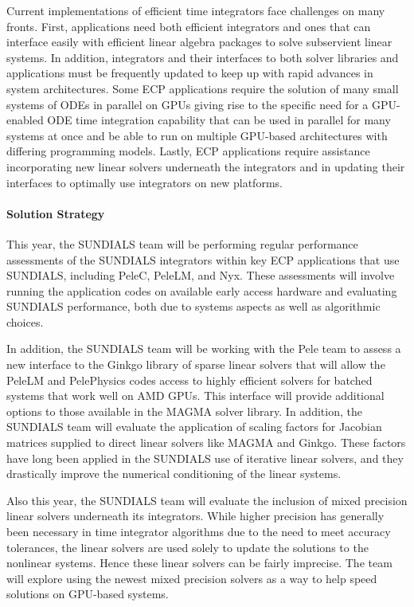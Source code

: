 Current implementations of efficient time integrators face challenges on many
fronts.  First, applications need both efficient integrators and ones that can
interface easily with efficient linear algebra packages to solve subservient
linear systems.  In addition, integrators and their interfaces to both solver
libraries and applications must be frequently updated to keep up with rapid
advances in system architectures. Some ECP applications require the solution of
many small systems of ODEs in parallel on GPUs giving rise to the specific need
for a GPU-enabled ODE time integration capability that can be used in parallel
for many systems at once and be able to run on multiple GPU-based architectures
with differing programming models.  Lastly, ECP applications require assistance
incorporating new linear solvers underneath the integrators and in updating
their interfaces to optimally use integrators on new platforms.


\paragraph{Solution Strategy}

This year, the SUNDIALS team will be performing regular performance assessments
of the SUNDIALS integrators within key ECP applications that use SUNDIALS,
including PeleC, PeleLM, and Nyx.  These assessments will involve running the
application codes on available early access hardware and evaluating SUNDIALS
performance, both due to systems aspects as well as algorithmic choices.

In addition, the SUNDIALS team will be working with the Pele team to assess a
new interface to the Ginkgo library of sparse linear solvers that will allow the
PeleLM and PelePhysics codes access to highly efficient solvers for batched
systems that work well on AMD GPUs.  This interface will provide additional
options to those available in the MAGMA solver library.  In addition, the
SUNDIALS team will evaluate the application of scaling factors for Jacobian
matrices supplied to direct linear solvers like MAGMA and Ginkgo.  These factors
have long been applied in the SUNDIALS use of iterative linear solvers, and they
drastically improve the numerical conditioning of the linear systems.

Also this year, the SUNDIALS team will evaluate the inclusion of mixed precision
linear solvers underneath its integrators.  While higher precision has generally
been necessary in time integrator algorithms due to the need to meet accuracy
tolerances, the linear solvers are used solely to update the solutions to the
nonlinear systems.  Hence these linear solvers can be fairly imprecise.  The
team will explore using the newest mixed precision solvers as a way to help
speed solutions on GPU-based systems.

